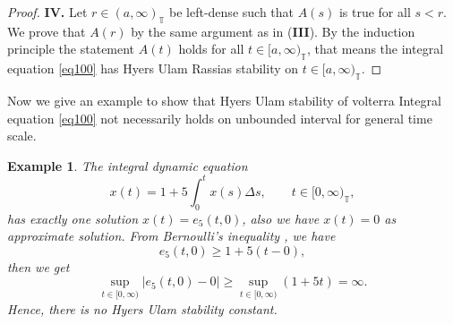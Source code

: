 \documentclass{article}
\newtheorem{exa}[thm]{Example}
\newcommand{\q}{\quad}
\begin{document}
\begin{proof}
\textbf{IV.} Let $r\in(a,\infty)_\mathbb{T}$ be left-dense such that $A(s)$ is true for all $s<r$. We prove that $A(r)$ by the same argument as in (\textbf{III}). By the induction principle the statement $A(t)$ holds for all $t\in[a,\infty)_\mathbb{T}$, that means the integral equation \eqref{eq100} has Hyers Ulam Rassias stability on $t\in[a,\infty)_\mathbb{T}$.
\end{proof}

Now we give an example to show that Hyers Ulam stability of volterra Integral equation \eqref{eq100} not necessarily holds on unbounded interval for general time scale.

\begin{exa}
The integral dynamic equation
$$
x(t)=1+5\int_0^tx(s)\Delta s, \q \q t\in [0,\infty)_\mathbb{T},
$$
has exactly one solution $x(t)=e_5(t,0)$, also we have $x(t)=0$ as approximate solution. From Bernoulli's inequality \cite{Boh1}, we have
$$
e_5(t,0)\geq 1+5(t-0),
$$
then we get
$$
\sup_{t\in [0,\infty)}|e_5(t,0)-0|\geq\sup_{t\in [0,\infty)}(1+5t)=\infty.
$$
Hence, there is no Hyers Ulam stability constant.
\end{exa}




\end{document}
